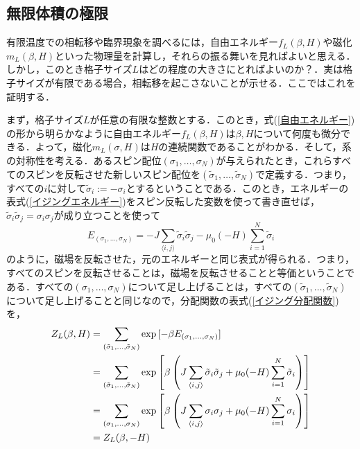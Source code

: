 \documentclass[a4paper,11pt]{jsreport}
\begin{document}
\subsection{無限体積の極限}
有限温度での相転移や臨界現象を調べるには，自由エネルギー$f_L(\beta, H)$や磁化$m_L(\beta, H)$といった物理量を計算し，それらの振る舞いを見ればよいと思える．しかし，このとき格子サイズ$L$はどの程度の大きさにとればよいのか？．実は格子サイズが有限である場合，相転移を起こさないことが示せる．ここではこれを証明する．\par
まず，格子サイズ$L$が任意の有限な整数とする．このとき，式(\ref{自由エネルギー})の形から明らかなように自由エネルギー$f_L(\beta, H)$は$\beta, H$について何度も微分できる．よって，磁化$m_L(\sigma, H)$は$H$の連続関数であることがわかる．そして，系の対称性を考える．あるスピン配位$(\sigma_1,\dots,\sigma_N)$が与えられたとき，これらすべてのスピンを反転させた新しいスピン配位を$(\tilde{\sigma}_1,\dots,\tilde{\sigma}_N)$で定義する．つまり，すべての$i$に対して$\tilde{\sigma}_i := -\sigma_i$とするということである．このとき，エネルギーの表式(\ref{イジングエネルギー})をスピン反転した変数を使って書き直せば，$\tilde{\sigma}_i \tilde{\sigma}_j = \sigma_i \sigma_j$が成り立つことを使って
\begin{equation}
  E_{(\sigma_1,\dots,\sigma_N)} = -J \sum_{\langle i,j \rangle} \tilde{\sigma}_i \tilde{\sigma}_j -\mu_0 (-H) \sum_{i=1}^{N} \tilde{\sigma}_i
\end{equation}
のように，磁場を反転させた，元のエネルギーと同じ表式が得られる．つまり，すべてのスピンを反転させることは，磁場を反転させることと等価ということである．すべての$(\sigma_1,\dots,\sigma_N)$について足し上げることは，すべての$(\tilde{\sigma}_1,\dots,\tilde{\sigma}_N)$について足し上げることと同じなので，分配関数の表式(\ref{イジング分配関数})を，
\begin{align}
  Z_L(\beta, H)
   & = \sum_{(\tilde{\sigma}_1,\dots,\tilde{\sigma}_N)} \exp{[-\beta E_{(\sigma_1,\dots,\sigma_N)}]} \notag                                                                                                        \\
   & = \sum_{(\tilde{\sigma}_1,\dots,\tilde{\sigma}_N)} \exp{\left[ \beta\left( J \sum_{\langle i,j \rangle} \tilde{\sigma}_i \tilde{\sigma}_j +\mu_0 (-H) \sum_{i=1}^{N} \tilde{\sigma}_i \right) \right]} \notag \\
   & = \sum_{(\sigma_1,\dots,\sigma_N)} \exp{\left[ \beta\left( J \sum_{\langle i,j \rangle} \sigma_i \sigma_j +\mu_0 (-H) \sum_{i=1}^{N} \sigma_i \right) \right]} \notag                                         \\
   & = Z_L(\beta, -H)
\end{align}
\end{document}
